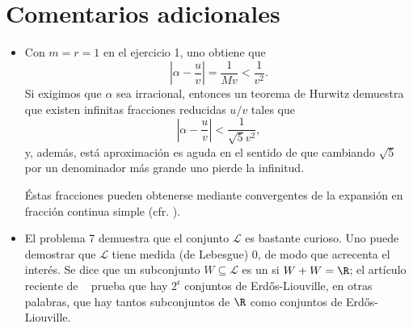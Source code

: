 \documentclass[11pt, reqno]{amsart}
\begin{document}
\section{Comentarios adicionales}
\begin{itemize}
	\item
		Con $m = r = 1$ en el ejercicio 1, uno obtiene que
		$$ \left| \alpha - \frac{u}{v} \right| = \frac{1}{Mv} < \frac{1}{v^2}. $$
		Si exigimos que $\alpha$ sea irracional, entonces un teorema de Hurwitz demuestra que existen infinitas fracciones
		reducidas $u/v$ tales que
		$$ \left| \alpha - \frac{u}{v} \right| < \frac{1}{\sqrt{5}v^2}, $$
		y, además, está aproximación es aguda en el sentido de que cambiando $\sqrt{5}$ por un denominador más grande uno pierde la infinitud.

		Éstas fracciones pueden obtenerse mediante convergentes de la expansión en fracción continua simple (cfr. \cite[256-257]{hua:number}).


	\item El problema 7 demuestra que el conjunto $\mathcal{L}$ es bastante curioso.
		Uno puede demostrar que $\mathcal{L}$ tiene medida (de Lebesgue) 0, de modo que acrecenta el interés.
		Se dice que un subconjunto $W \subseteq \mathcal{L}$ es un  si $W + W = \R$;
		el artículo reciente de \citeauthor{chalebgwa2023sets}~\cite{chalebgwa2023sets} prueba que hay $2^{\mathfrak{c}}$ conjuntos de Erd\H os-Liouville,
		en otras palabras, que hay tantos subconjuntos de $\R$ como conjuntos de Erd\H os-Liouville.
\end{itemize}

\nocite{hlawka:number}
\printbibliography[title={Referencias y lecturas adicionales}]
\end{document}
